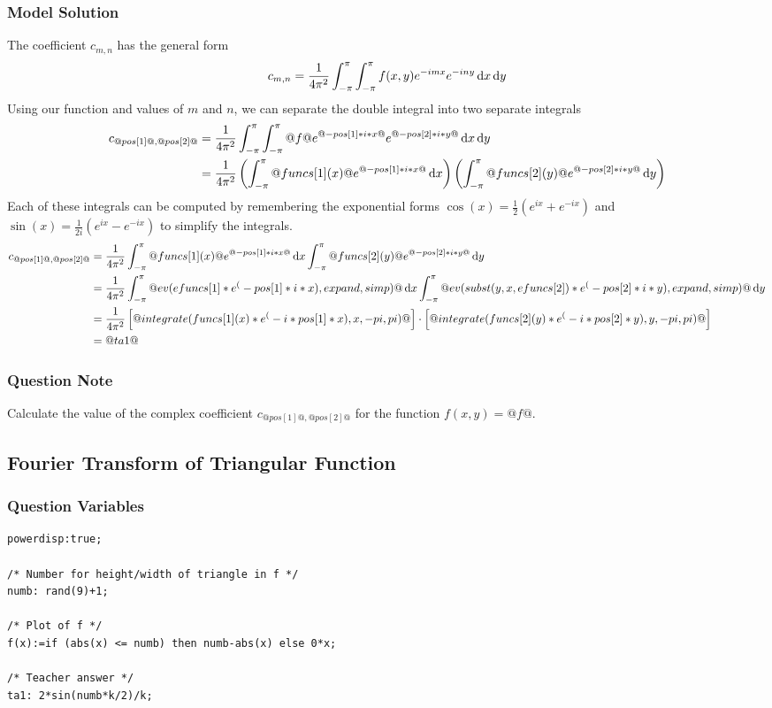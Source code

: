 \documentclass[a4paper,10pt]{article}
\begin{document}
\subsubsection{Model Solution}
The coefficient $c_{m,n}$ has the general form \[ c_{m,n} = {1 \over 4 \pi^2} \int_{-\pi}^\pi \int_{-\pi}^\pi f(x,y) e^{-imx}e^{-iny}\, \text{d}x \, \text{d}y \] Using our function and values of $m$ and $n$, we can separate the double integral into two separate integrals \begin{align*} c_{@pos[1]@,@pos[2]@} &= {1 \over 4 \pi^2} \int_{-\pi}^\pi \int_{-\pi}^\pi @f@ e^{@-pos[1]*i*x@}e^{@-pos[2]*i*y@}\, \text{d}x \, \text{d}y \\ &= {1 \over 4 \pi^2} \left( \int_{-\pi}^\pi @funcs[1](x)@ e^{@-pos[1]*i*x@}\, \text{d}x \right) \left( \int_{-\pi}^\pi @funcs[2](y)@ e^{@-pos[2]*i*y@}  \, \text{d}y \right) \end{align*} Each of these integrals can be computed by remembering the exponential forms \(\cos(x) = \frac{1}{2}(e^{ix}+e^{-ix})\) and \(\sin(x) = \frac{1}{2i}(e^{ix}-e^{-ix})\) to simplify the integrals. \begin{align*} c_{@pos[1]@,@pos[2]@} &= {1 \over 4 \pi^2} \int_{-\pi}^\pi @funcs[1](x)@ e^{@-pos[1]*i*x@}\, \text{d}x \int_{-\pi}^\pi @funcs[2](y)@ e^{@-pos[2]*i*y@} \, \text{d}y \\
&= {1 \over 4 \pi^2} \int_{-\pi}^\pi @ev(efuncs[1]*e^(-pos[1]*i*x),expand,simp)@ \, \text{d}x \int_{-\pi}^\pi @ev(subst(y,x,efuncs[2])*e^(-pos[2]*i*y),expand,simp)@ \, \text{d}y \\
&= {1 \over 4 \pi^2} \left[ @integrate(funcs[1](x)*e^(-i*pos[1]*x),x,-pi,pi)@ \right] \cdot \left[ @integrate(funcs[2](y)*e^(-i*pos[2]*y),y,-pi,pi)@ \right] \\
&= @ta1@ \end{align*}
\subsubsection{Question Note}
Calculate the value of the complex coefficient \(c_{@pos[1]@,@pos[2]@}\) for the function \(f(x,y)=@f@\).

\subsection{Fourier Transform of Triangular Function}
\subsubsection{Question Variables}
\begin{lstlisting}
powerdisp:true;

/* Number for height/width of triangle in f */
numb: rand(9)+1;

/* Plot of f */
f(x):=if (abs(x) <= numb) then numb-abs(x) else 0*x;

/* Teacher answer */
ta1: 2*sin(numb*k/2)/k;
\end{lstlisting}
\end{document}
